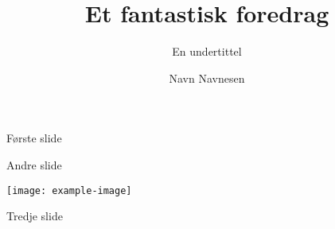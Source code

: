\documentclass[norsk]{beamer}
\author{Navn Navnesen}
\title{Et fantastisk foredrag}
\subtitle{En undertittel}
\begin{document}
\begin{frame}{Første slide}
	\lipsum[1]
\end{frame}

\begin{frame}{Andre slide}
	\begin{center}
		\texttt{[image: example-image]}
	\end{center}
\end{frame}

\begin{frame}{Tredje slide}
	\lipsum[3]
\end{frame}
\end{document}

